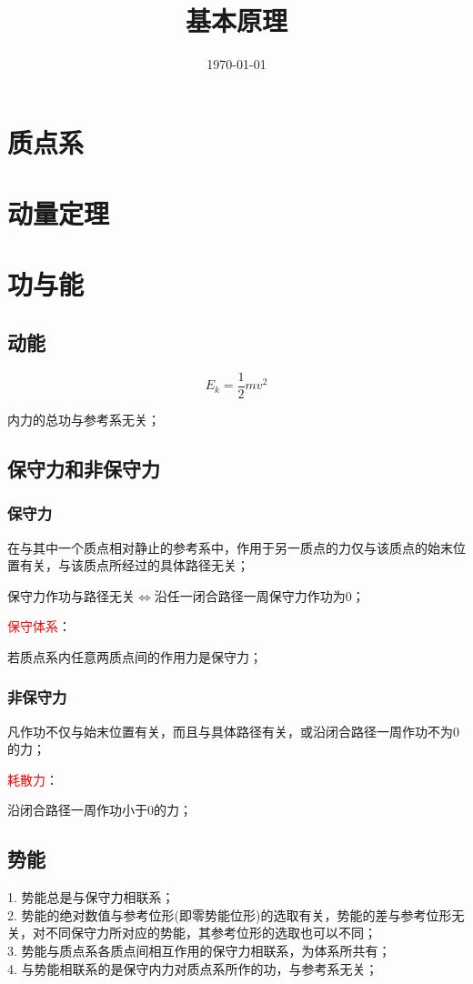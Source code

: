 \documentclass[12pt,a4paper]{article}
\title{基本原理}
\author{}
\date{\today}
\begin{document}
\maketitle

\section{质点系}

\section{动量定理}

\section{功与能}
\subsection{动能}
\begin{equation}
E_k = \frac{1}{2} m v^2
\end{equation}

内力的总功与参考系无关；

\subsection{保守力和非保守力}
\subsubsection{保守力}
在与其中一个质点相对静止的参考系中，作用于另一质点的力仅与该质点的始末位置有关，与该质点所经过的具体路径无关；

保守力作功与路径无关$\Longleftrightarrow$沿任一闭合路径一周保守力作功为$0$；

\textcolor{red}{保守体系}：

若质点系内任意两质点间的作用力是保守力；

\subsubsection{非保守力}
凡作功不仅与始末位置有关，而且与具体路径有关，或沿闭合路径一周作功不为$0$的力；

\textcolor{red}{耗散力}：

沿闭合路径一周作功小于$0$的力；

\subsection{势能}
1. 势能总是与保守力相联系；\\
2. 势能的绝对数值与参考位形(即零势能位形)的选取有关，势能的差与参考位形无关，对不同保守力所对应的势能，其参考位形的选取也可以不同；\\
3. 势能与质点系各质点间相互作用的保守力相联系，为体系所共有；\\
4. 与势能相联系的是保守内力对质点系所作的功，与参考系无关；
\end{document}

